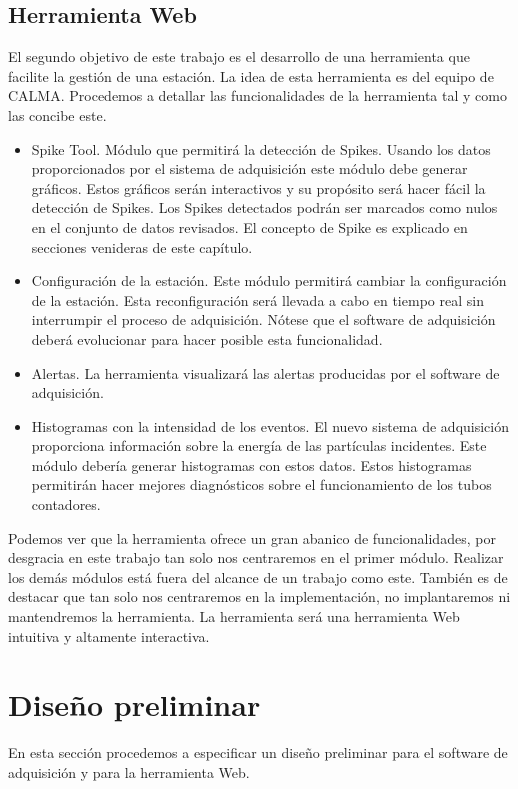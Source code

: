 	\subsection{Herramienta Web}
		El segundo objetivo de este trabajo es el desarrollo de una herramienta que facilite la gestión de una estación. La idea de esta
		herramienta es del equipo de CALMA. Procedemos a detallar las funcionalidades de la herramienta tal y como las concibe este.
		\begin{itemize}
	         	\item	Spike Tool. Módulo que permitirá la detección de Spikes. Usando los datos proporcionados por el sistema de
			  	adquisición este módulo debe generar gráficos. Estos gráficos serán interactivos y su propósito será hacer fácil la
				detección de Spikes. Los Spikes detectados podrán ser marcados como nulos en el conjunto de datos revisados. El
				concepto de Spike es explicado en secciones venideras de este capítulo.
			\item 	Configuración de la estación. Este módulo permitirá cambiar la configuración de la estación. Esta reconfiguración será
				llevada a cabo en tiempo real sin interrumpir el proceso de adquisición. Nótese que el software de adquisición deberá
				evolucionar para hacer posible esta funcionalidad.
			\item	Alertas. La herramienta visualizará las alertas producidas por el software de adquisición.
			\item 	Histogramas con la intensidad de los eventos. El nuevo sistema de adquisición proporciona información sobre la energía
				de las partículas incidentes. Este módulo debería generar histogramas con estos datos. Estos histogramas permitirán
				hacer mejores diagnósticos sobre el funcionamiento de los tubos contadores. 
		\end{itemize}
		Podemos ver que la herramienta ofrece un gran abanico de funcionalidades, por desgracia en este trabajo tan solo nos centraremos en el
		primer módulo. Realizar los demás módulos está fuera del alcance de un trabajo como este. También es de destacar que tan solo nos
		centraremos en la implementación, no implantaremos ni mantendremos la herramienta. La herramienta será una herramienta Web intuitiva y
		altamente interactiva. 

\section{Diseño preliminar}
	En esta sección procedemos a especificar un diseño preliminar para el software de adquisición y para la herramienta Web.
